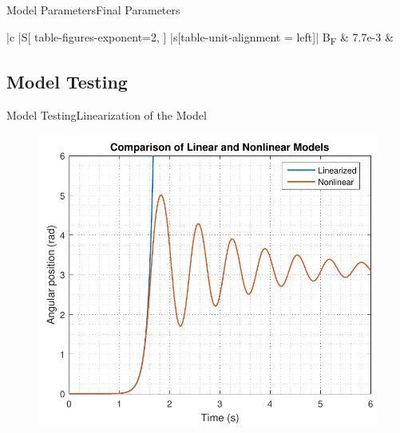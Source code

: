 \begin{frame}{Model Parameters}{Final Parameters}
\begin{table}[H]
\begin{tabular}{
  |c
  |S[
    table-figures-exponent=2,
    ]
  |s[table-unit-alignment = left]|
  }
      \si{B_F}            & 7.7e-3                              & \newton\metre\second\per\radian\\
    \hline%
  \end{tabular}
  \end{table}
\end{frame}

\subsection{Model Testing}
\begin{frame}{Model Testing}{Linearization of the Model}
  \begin{minipage}{\linewidth}\centering
    \begin{minipage}{0.45\linewidth}
      \begin{figure}[H]
        \centering
        \includegraphics[scale=0.33]{Pictures/LinearizedVSNonlinear}
      \end{figure}
    \end{minipage}
    \begin{minipage}{0.45\linewidth}
      \begin{figure}[H]
        \centering

\end{figure}
\end{minipage}
\end{minipage}
\end{frame}
